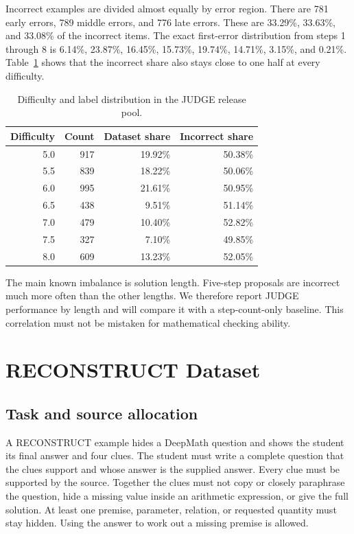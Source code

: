 \documentclass[11pt]{article}
\begin{document}
Incorrect examples are divided almost equally by error region. There are 781 early errors, 789 middle errors, and 776 late errors. These are 33.29\%, 33.63\%, and 33.08\% of the incorrect items. The exact first-error distribution from steps 1 through 8 is 6.14\%, 23.87\%, 16.45\%, 15.73\%, 19.74\%, 14.71\%, 3.15\%, and 0.21\%. Table~\ref{tab:judge-difficulty} shows that the incorrect share also stays close to one half at every difficulty.

\begin{table}[t]
\centering
\small
\setlength{\tabcolsep}{4pt}
\begin{tabular}{rrrr}
\toprule
Difficulty & Count & Dataset share & Incorrect share \\
\midrule
5.0 & 917 & 19.92\% & 50.38\% \\
5.5 & 839 & 18.22\% & 50.06\% \\
6.0 & 995 & 21.61\% & 50.95\% \\
6.5 & 438 & 9.51\% & 51.14\% \\
7.0 & 479 & 10.40\% & 52.82\% \\
7.5 & 327 & 7.10\% & 49.85\% \\
8.0 & 609 & 13.23\% & 52.05\% \\
\bottomrule
\end{tabular}
\caption{Difficulty and label distribution in the JUDGE release pool.}
\label{tab:judge-difficulty}
\end{table}

The main known imbalance is solution length. Five-step proposals are incorrect much more often than the other lengths. We therefore report JUDGE performance by length and will compare it with a step-count-only baseline. This correlation must not be mistaken for mathematical checking ability.

\section{RECONSTRUCT Dataset}

\subsection{Task and source allocation}

A RECONSTRUCT example hides a DeepMath question and shows the student its final answer and four clues. The student must write a complete question that the clues support and whose answer is the supplied answer. Every clue must be supported by the source. Together the clues must not copy or closely paraphrase the question, hide a missing value inside an arithmetic expression, or give the full solution. At least one premise, parameter, relation, or requested quantity must stay hidden. Using the answer to work out a missing premise is allowed.
\end{document}
